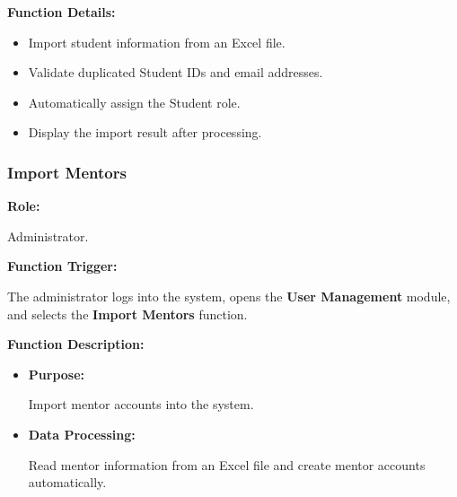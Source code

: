 \vspace{0.3cm}

\textbf{Function Details:}

\begin{itemize}
    \item Import student information from an Excel file.

    \item Validate duplicated Student IDs and email addresses.

    \item Automatically assign the Student role.

    \item Display the import result after processing.
\end{itemize}


\subsubsection{Import Mentors}

\textbf{Role:}

Administrator.

\vspace{0.3cm}

\textbf{Function Trigger:}

The administrator logs into the system, opens the \textbf{User Management} module, and selects the \textbf{Import Mentors} function.

\vspace{0.3cm}

\textbf{Function Description:}

\begin{itemize}
    \item \textbf{Purpose:}

    Import mentor accounts into the system.

    \item \textbf{Data Processing:}

    Read mentor information from an Excel file and create mentor accounts automatically.
\end{itemize}

